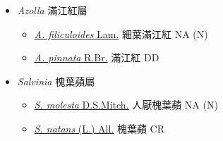 
  \begin{itemize}
 \item[    ] \textit{Azolla} 滿江紅屬
                                
  \begin{itemize}
        \item[] \href{http://www.theplantlist.org/tpl1.1/search?q=Azolla+filiculoides}{\textit{A. filiculoides} Lam.}   細葉滿江紅   NA (N)
        \item[] \href{http://www.theplantlist.org/tpl1.1/search?q=Azolla+pinnata}{\textit{A. pinnata} R.Br.}   滿江紅   DD
  \end{itemize}
 \item[    ] \textit{Salvinia} 槐葉蘋屬
                                
  \begin{itemize}
        \item[] \href{http://www.theplantlist.org/tpl1.1/search?q=Salvinia+molesta}{\textit{S. molesta} D.S.Mitch.}   人厭槐葉蘋   NA (N)
        \item[] \href{http://www.theplantlist.org/tpl1.1/search?q=Salvinia+natans}{\textit{S. natans} (L.) All.}   槐葉蘋   CR
  \end{itemize}
  \end{itemize}

